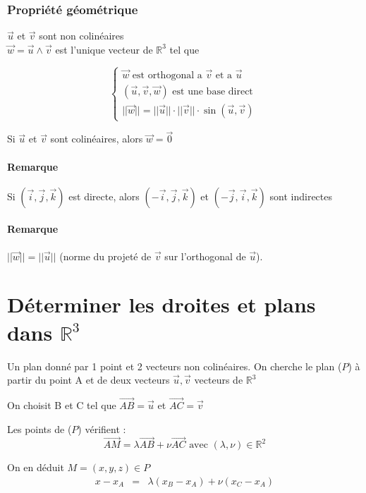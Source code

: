 	\subsubsection{Propriété géométrique}
		$\vec{u}$ et $\vec{v}$ sont non colinéaires ~\\
		$\vec{w} = \vec{u} \wedge \vec{v}$ est l'unique vecteur de $\mathbb{R}^3$ tel que 

		\[\left\{\begin{array}{c}
				\vec{w} \text{ est orthogonal a } \vec{v} \text{ et a } \vec{u} \\
				(\vec{u}, \vec{v}, \vec{w}) \text{ est une base direct } \\
		||\vec{w}|| = ||\vec{u}||\cdot ||\vec{v}|| \cdot \sin(\vec{u}, \vec{v})\end{array}\right.\]

		Si $\vec{u}$ et $\vec{v}$ sont colinéaires, alors $\vec{w} = \vec{0}$

		\paragraph{Remarque} Si $(\vec{i}, \vec{j}, \vec{k})$ est directe, alors $(-\vec{i}, \vec{j}, \vec{k})$ et $(-\vec{j}, \vec{i}, \vec{k})$ sont indirectes

		\paragraph{Remarque} $||\vec{w}|| = ||\vec{u}||$ (norme du projeté de $\vec{v}$ sur l'orthogonal de $\vec{u}$).

		\section{Déterminer les droites et plans dans $\mathbb{R}^3$}

		Un plan donné par 1 point et 2 vecteurs non colinéaires. On cherche le plan ($P$) à partir du point A et de deux vecteurs $\vec{u}, \vec{v}$ vecteurs de $\mathbb{R}^3$

		On choisit B et C tel que $\vec{AB} = \vec{u}$ et $\vec{AC} = \vec{v}$

		Les points de ($P$) vérifient :
		\[\vec{AM} = \lambda \vec{AB} + \nu \vec{AC} \text{ avec } (\lambda, \nu) \in \mathbb{R}^2\]

		On en déduit $M=(x, y, z) \in P$
		 \[\begin{array}{rcl}
				 x - x_A &=& \lambda(x_B - x_A) + \nu (x_C - x_A)
		 \end{array}\]


